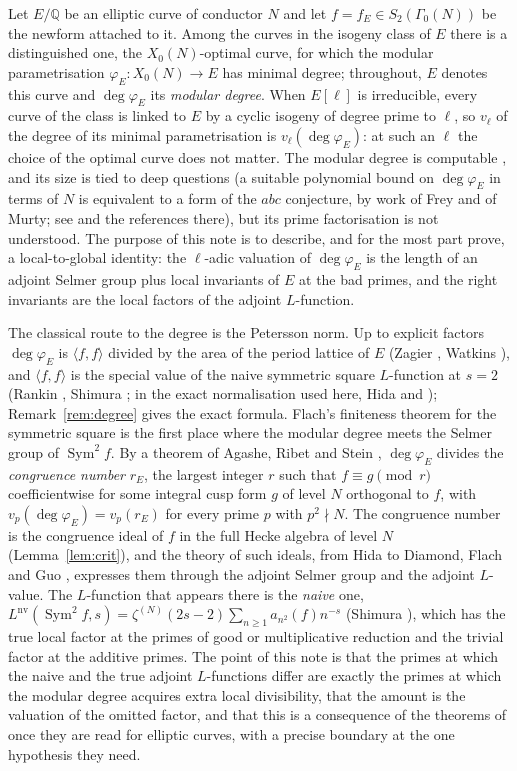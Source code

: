\documentclass[11pt]{amsart}
\theoremstyle{definition}
\newcommand{\Q}{\mathbb{Q}}
\newcommand{\degphi}{\deg\varphi_E}
\newcommand{\Sym}{\operatorname{Sym}^2}
\newcommand{\nv}{\mathrm{nv}}
\begin{document}
Let $E/\Q$ be an elliptic curve of conductor $N$ and let $f=f_E\in S_2(\Gamma_0(N))$ be the newform attached to it. Among the curves in the isogeny class of $E$ there is a distinguished one, the $X_0(N)$-optimal curve, for which the modular parametrisation $\varphi_E\colon X_0(N)\to E$ has minimal degree; throughout, $E$ denotes this curve and $\degphi$ its \emph{modular degree}. When $E[\ell]$ is irreducible, every curve of the class is linked to $E$ by a cyclic isogeny of degree prime to $\ell$, so $v_\ell$ of the degree of its minimal parametrisation is $v_\ell(\degphi)$: at such an $\ell$ the choice of the optimal curve does not matter. The modular degree is computable \cite{Cremona97,Watkins02}, and its size is tied to deep questions (a suitable polynomial bound on $\degphi$ in terms of $N$ is equivalent to a form of the $abc$ conjecture, by work of Frey and of Murty; see \cite[\S2]{ARS12} and the references there), but its prime factorisation is not understood. The purpose of this note is to describe, and for the most part prove, a local-to-global identity: the $\ell$-adic valuation of $\degphi$ is the length of an adjoint Selmer group plus local invariants of $E$ at the bad primes, and the right invariants are the local factors of the adjoint $L$-function.

The classical route to the degree is the Petersson norm. Up to explicit factors $\degphi$ is $\langle f,f\rangle$ divided by the area of the period lattice of $E$ (Zagier \cite{Zagier85}, Watkins \cite{Watkins02}), and $\langle f,f\rangle$ is the special value of the naive symmetric square $L$-function at $s=2$ (Rankin \cite{Rankin39}, Shimura \cite{Shimura76}; in the exact normalisation used here, Hida \cite[Theorem 5.1]{Hida81} and \cite[Lemma 2.12]{DFG04}); Remark~\ref{rem:degree} gives the exact formula. Flach's finiteness theorem for the symmetric square \cite{Flach92} is the first place where the modular degree meets the Selmer group of $\Sym f$. By a theorem of Agashe, Ribet and Stein \cite[Theorem 2.2]{ARS12}, $\degphi$ divides the \emph{congruence number} $r_E$, the largest integer $r$ such that $f\equiv g\pmod r$ coefficientwise for some integral cusp form $g$ of level $N$ orthogonal to $f$, with $v_p(\degphi)=v_p(r_E)$ for every prime $p$ with $p^2\nmid N$. The congruence number is the congruence ideal of $f$ in the full Hecke algebra of level $N$ (Lemma~\ref{lem:crit}), and the theory of such ideals, from Hida \cite{Hida81} to Diamond, Flach and Guo \cite{DFG04}, expresses them through the adjoint Selmer group and the adjoint $L$-value. The $L$-function that appears there is the \emph{naive} one, $L^{\nv}(\Sym f,s)=\zeta^{(N)}(2s-2)\sum_{n\ge1}a_{n^2}(f)n^{-s}$ (Shimura \cite{Shimura75}), which has the true local factor at the primes of good or multiplicative reduction and the trivial factor at the additive primes. The point of this note is that the primes at which the naive and the true adjoint $L$-functions differ are exactly the primes at which the modular degree acquires extra local divisibility, that the amount is the valuation of the omitted factor, and that this is a consequence of the theorems of \cite{DFG04} once they are read for elliptic curves, with a precise boundary at the one hypothesis they need.
\end{document}
